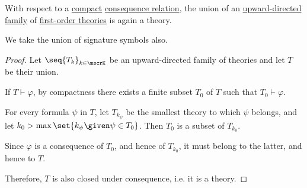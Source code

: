 \begin{lemma}\label{thm:upward_union_of_theories}
  With respect to a \hyperref[def:consequence_relation/compactness]{compact} \hyperref[def:consequence_relation]{consequence relation}, the union of an \hyperref[def:directed_set]{upward-directed family} of \hyperref[def:fol_theory]{first-order theories} is again a theory.
\end{lemma}
\begin{comments}
  \item We take the union of signature symbols also.
\end{comments}
\begin{proof}
  Let \( \seq{ T_k }_{k \in \mscrK} \) be an upward-directed family of theories and let \( T \) be their union.

  If \( T \vdash \varphi \), by compactness there exists a finite subset \( T_0 \) of \( T \) such that \( T_0 \vdash \varphi \).

  For every formula \( \psi \) in \( T \), let \( T_{k_\psi} \) be the smallest theory to which \( \psi \) belongs, and let \( k_0 > \max\set{ k_\psi \given \psi \in T_0 } \). Then \( T_0 \) is a subset of \( T_{k_0} \).

  Since \( \varphi \) is a consequence of \( T_0 \), and hence of \( T_{k_0} \), it must belong to the latter, and hence to \( T \).

  Therefore, \( T \) is also closed under consequence, i.e. it is a theory.
\end{proof}

